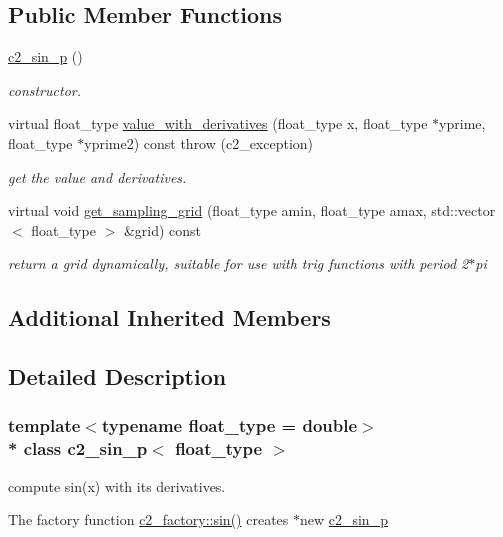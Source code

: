 \subsection*{Public Member Functions}
\begin{DoxyCompactItemize}
\item 
\hyperlink{classc2__sin__p_a56b29be4cdd63a55e0b14e99a9eaa3dd}{c2\+\_\+sin\+\_\+p} ()
\begin{DoxyCompactList}\small\item\em constructor. \end{DoxyCompactList}\item 
virtual float\+\_\+type \hyperlink{classc2__sin__p_a9710a5d48360f4c6e1568f1ad849dd7b}{value\+\_\+with\+\_\+derivatives} (float\+\_\+type x, float\+\_\+type $\ast$yprime, float\+\_\+type $\ast$yprime2) const   throw (c2\+\_\+exception)
\begin{DoxyCompactList}\small\item\em get the value and derivatives. \end{DoxyCompactList}\item 
virtual void \hyperlink{classc2__sin__p_a24cee8161741bd4a4dbb24dd782514c1}{get\+\_\+sampling\+\_\+grid} (float\+\_\+type amin, float\+\_\+type amax, std\+::vector$<$ float\+\_\+type $>$ \&grid) const 
\begin{DoxyCompactList}\small\item\em return a grid dynamically, suitable for use with trig functions with period 2$\ast$pi \end{DoxyCompactList}\end{DoxyCompactItemize}
\subsection*{Additional Inherited Members}


\subsection{Detailed Description}
\subsubsection*{template$<$typename float\+\_\+type = double$>$\\*
class c2\+\_\+sin\+\_\+p$<$ float\+\_\+type $>$}

compute sin(x) with its derivatives.

The factory function \hyperlink{classc2__factory_a866854d4fdd6c6678512151dbcd635a5}{c2\+\_\+factory\+::sin()} creates $\ast$new \hyperlink{classc2__sin__p}{c2\+\_\+sin\+\_\+p} 

